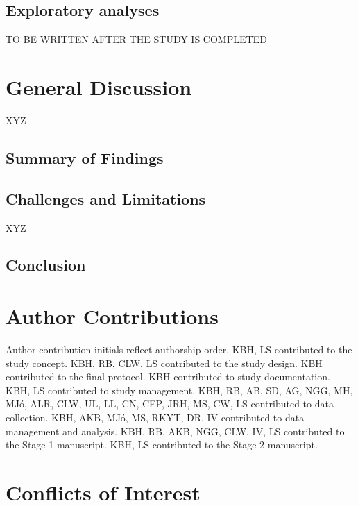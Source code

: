 \documentclass[,man,floatsintext]{apa6}
\begin{document}
\hypertarget{exploratory-analyses}{%
\subsection{Exploratory analyses}\label{exploratory-analyses}}

TO BE WRITTEN AFTER THE STUDY IS COMPLETED

\hypertarget{general-discussion}{%
\section{General Discussion}\label{general-discussion}}

XYZ

\hypertarget{summary-of-findings}{%
\subsection{Summary of Findings}\label{summary-of-findings}}

\hypertarget{challenges-and-limitations}{%
\subsection{Challenges and Limitations}\label{challenges-and-limitations}}

XYZ

\hypertarget{conclusion}{%
\subsection{Conclusion}\label{conclusion}}

\hypertarget{author-contributions}{%
\section{Author Contributions}\label{author-contributions}}

Author contribution initials reflect authorship order. KBH, LS contributed to the study concept. KBH, RB, CLW, LS contributed to the study design. KBH contributed to the final protocol. KBH contributed to study documentation. KBH, LS contributed to study management. KBH, RB, AB, SD, AG, NGG, MH, MJó, ALR, CLW, UL, LL, CN, CEP, JRH, MS, CW, LS contributed to data collection. KBH, AKB, MJó, MS, RKYT, DR, IV contributed to data management and analysis. KBH, RB, AKB, NGG, CLW, IV, LS contributed to the Stage 1 manuscript. KBH, LS contributed to the Stage 2 manuscript.

\hypertarget{conflicts-of-interest}{%
\section{Conflicts of Interest}\label{conflicts-of-interest}}
\end{document}
